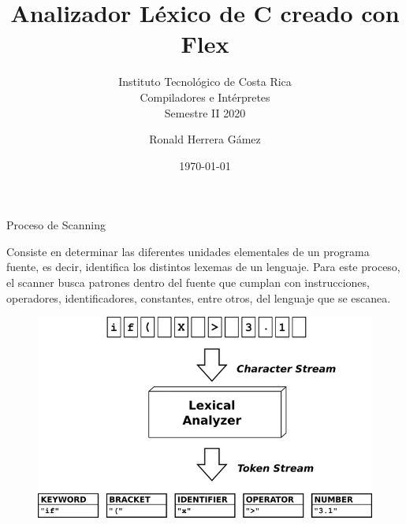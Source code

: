 \documentclass[compress]{beamer}
\title{Analizador Léxico de C creado con Flex}
\subtitle{Instituto Tecnológico de Costa Rica \\Compiladores e Intérpretes \\Semestre II 2020}
\author{Ronald Herrera Gámez}
\date{\today}
\begin{document}
\begin{frame}
  \maketitle
\end{frame}

\begin{frame}{Proceso de Scanning}

    \justifying
    Consiste en determinar las diferentes unidades elementales de un programa fuente, es decir, identifica los distintos lexemas de un lenguaje. 
    Para este proceso, el scanner busca patrones dentro del fuente que cumplan con instrucciones, operadores, identificadores, constantes, entre 
    otros, del lenguaje que se escanea.
    
    \begin{figure}
        \centering
        \includegraphics[scale=1.2]{images/scanning.png}
    \end{figure}

\end{frame}
\end{document}
